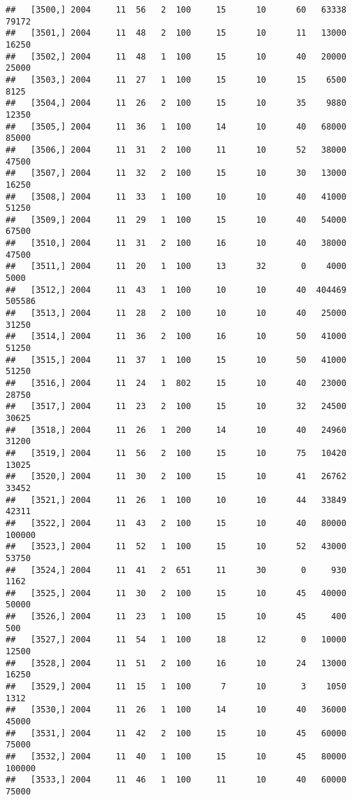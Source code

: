 \documentclass{article}\usepackage[]{graphicx}\usepackage[]{color}
\makeatletter
\newenvironment{kframe}{%
 \def\at@end@of@kframe{}%
 \ifinner\ifhmode%
  \def\at@end@of@kframe{\end{minipage}}%
  \begin{minipage}{\columnwidth}%
 \fi\fi%
 \def\FrameCommand##1{\hskip\@totalleftmargin \hskip-\fboxsep
 \colorbox{shadecolor}{##1}\hskip-\fboxsep
     \hskip-\linewidth \hskip-\@totalleftmargin \hskip\columnwidth}%
 \MakeFramed {\advance\hsize-\width
   \@totalleftmargin\z@ \linewidth\hsize
   \@setminipage}}%
 {\par\unskip\endMakeFramed%
 \at@end@of@kframe}
\newenvironment{knitrout}{}{} %
\makeatother
\begin{document}
\begin{knitrout}
\begin{kframe}
\begin{verbatim}
##   [3500,] 2004     11  56   2  100     15      10      60   63338   79172
##   [3501,] 2004     11  48   2  100     15      10      11   13000   16250
##   [3502,] 2004     11  48   1  100     15      10      40   20000   25000
##   [3503,] 2004     11  27   1  100     15      10      15    6500    8125
##   [3504,] 2004     11  26   2  100     15      10      35    9880   12350
##   [3505,] 2004     11  36   1  100     14      10      40   68000   85000
##   [3506,] 2004     11  31   2  100     11      10      52   38000   47500
##   [3507,] 2004     11  32   2  100     15      10      30   13000   16250
##   [3508,] 2004     11  33   1  100     10      10      40   41000   51250
##   [3509,] 2004     11  29   1  100     15      10      40   54000   67500
##   [3510,] 2004     11  31   2  100     16      10      40   38000   47500
##   [3511,] 2004     11  20   1  100     13      32       0    4000    5000
##   [3512,] 2004     11  43   1  100     10      10      40  404469  505586
##   [3513,] 2004     11  28   2  100     10      10      40   25000   31250
##   [3514,] 2004     11  36   2  100     16      10      50   41000   51250
##   [3515,] 2004     11  37   1  100     15      10      50   41000   51250
##   [3516,] 2004     11  24   1  802     15      10      40   23000   28750
##   [3517,] 2004     11  23   2  100     15      10      32   24500   30625
##   [3518,] 2004     11  26   1  200     14      10      40   24960   31200
##   [3519,] 2004     11  56   2  100     15      10      75   10420   13025
##   [3520,] 2004     11  30   2  100     15      10      41   26762   33452
##   [3521,] 2004     11  26   1  100     10      10      44   33849   42311
##   [3522,] 2004     11  43   2  100     15      10      40   80000  100000
##   [3523,] 2004     11  52   1  100     15      10      52   43000   53750
##   [3524,] 2004     11  41   2  651     11      30       0     930    1162
##   [3525,] 2004     11  30   2  100     15      10      45   40000   50000
##   [3526,] 2004     11  23   1  100     15      10      45     400     500
##   [3527,] 2004     11  54   1  100     18      12       0   10000   12500
##   [3528,] 2004     11  51   2  100     16      10      24   13000   16250
##   [3529,] 2004     11  15   1  100      7      10       3    1050    1312
##   [3530,] 2004     11  26   1  100     14      10      40   36000   45000
##   [3531,] 2004     11  42   2  100     15      10      45   60000   75000
##   [3532,] 2004     11  40   1  100     15      10      45   80000  100000
##   [3533,] 2004     11  46   1  100     11      10      40   60000   75000

\end{verbatim}
\end{kframe}
\end{knitrout}
\end{document}
